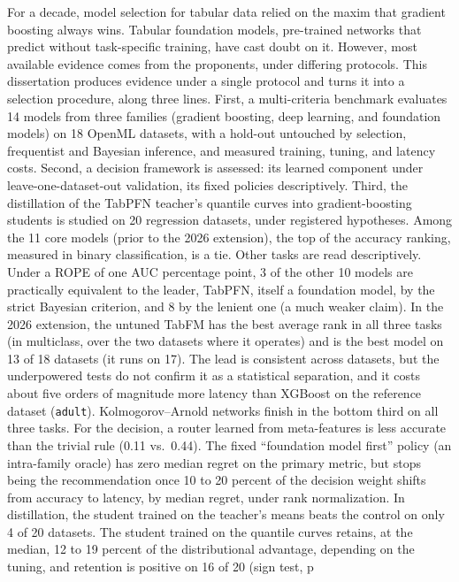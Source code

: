 \enlargethispage{2\baselineskip}%
For a decade, model selection for tabular data relied on the maxim that
gradient boosting always wins. Tabular foundation models, pre-trained
networks that predict without task-specific training, have cast doubt on it.
However, most available evidence comes from the proponents, under
differing protocols. This dissertation produces evidence under a single
protocol and turns it into a selection procedure, along three lines. First,
a multi-criteria benchmark evaluates 14 models from three families
(gradient boosting, deep learning, and foundation models) on 18 OpenML
datasets, with a hold-out untouched by selection, frequentist and
Bayesian inference, and measured training, tuning, and latency costs.
Second, a decision framework is assessed: its learned component under
leave-one-dataset-out validation, its fixed policies descriptively. Third, the distillation of the TabPFN teacher's quantile curves into
gradient-boosting students is studied on 20 regression datasets, under registered
hypotheses. Among the 11 core models (prior to the 2026 extension), the top
of the accuracy ranking, measured in binary classification, is a tie. Other
tasks are read descriptively. Under a ROPE of one AUC percentage point,
3 of the other 10 models are practically equivalent to the leader, TabPFN, itself a foundation model,
by the strict Bayesian criterion, and 8 by the lenient one (a much weaker claim). In the 2026 extension, the untuned TabFM has the best average rank in all three tasks (in multiclass, over the two
datasets where it operates) and is the best model on 13 of 18 datasets
(it runs on 17). The lead is consistent across datasets, but the
underpowered tests do not confirm it as a statistical separation, and it costs about five orders of magnitude more latency than XGBoost on the reference dataset
(\texttt{adult}). Kolmogorov--Arnold networks finish in the bottom third on
all three tasks. For the decision, a router learned from meta-features is
less accurate than the trivial rule (0.11 vs.\ 0.44). The fixed
``foundation model first'' policy (an intra-family oracle) has zero median
regret on the primary metric, but stops being the recommendation
once 10 to 20 percent of the decision weight shifts from accuracy to
latency, by median regret, under rank normalization. In distillation, the
student trained on the teacher's means beats the control on only 4 of 20
datasets. The student trained on the quantile curves retains, at the
median, 12 to 19 percent of the distributional advantage, depending on the tuning, and retention is positive on 16 of 20 (sign test, p

